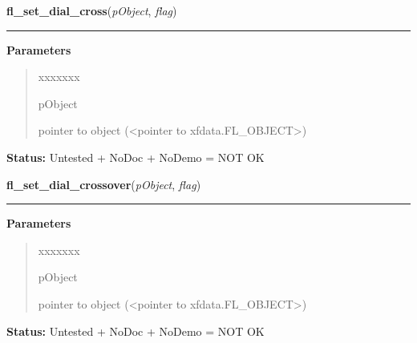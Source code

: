 \hspace{.8\funcindent}\begin{boxedminipage}{\funcwidth}

    \raggedright \textbf{fl\_set\_dial\_cross}(\textit{pObject}, \textit{flag})

    \vspace{-1.5ex}

    \rule{\textwidth}{0.5\fboxrule}
\setlength{\parskip}{2ex}
\setlength{\parskip}{1ex}
      \textbf{Parameters}
      \vspace{-1ex}

      \begin{quote}
        \begin{Ventry}{xxxxxxx}

          \item[pObject]

          pointer to object ({\textless}pointer to 
          xfdata.FL\_OBJECT{\textgreater})

        \end{Ventry}

      \end{quote}

\textbf{Status:} Untested + NoDoc + NoDemo = NOT OK



    \end{boxedminipage}

    \label{xformslib:library:fl_set_dial_cross}

    \vspace{0.5ex}

\hspace{.8\funcindent}\begin{boxedminipage}{\funcwidth}

    \raggedright \textbf{fl\_set\_dial\_crossover}(\textit{pObject}, \textit{flag})

    \vspace{-1.5ex}

    \rule{\textwidth}{0.5\fboxrule}
\setlength{\parskip}{2ex}
\setlength{\parskip}{1ex}
      \textbf{Parameters}
      \vspace{-1ex}

      \begin{quote}
        \begin{Ventry}{xxxxxxx}

          \item[pObject]

          pointer to object ({\textless}pointer to 
          xfdata.FL\_OBJECT{\textgreater})

        \end{Ventry}

      \end{quote}

\textbf{Status:} Untested + NoDoc + NoDemo = NOT OK



    \end{boxedminipage}

